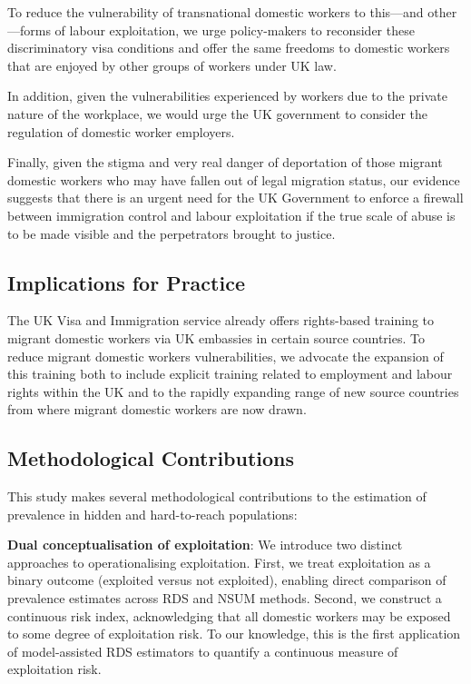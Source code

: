 \documentclass[
  12pt,
  letterpaper,
  DIV=11,
  numbers=noendperiod]{scrartcl}
\theoremstyle{plain}
\theoremstyle{definition}
\begin{document}
To reduce the vulnerability of transnational domestic workers to
this---and other---forms of labour exploitation, we urge policy-makers
to reconsider these discriminatory visa conditions and offer the same
freedoms to domestic workers that are enjoyed by other groups of workers
under UK law.

In addition, given the vulnerabilities experienced by workers due to the
private nature of the workplace, we would urge the UK government to
consider the regulation of domestic worker employers.

Finally, given the stigma and very real danger of deportation of those
migrant domestic workers who may have fallen out of legal migration
status, our evidence suggests that there is an urgent need for the UK
Government to enforce a firewall between immigration control and labour
exploitation if the true scale of abuse is to be made visible and the
perpetrators brought to justice.

\subsection{Implications for Practice}\label{implications-for-practice}

The UK Visa and Immigration service already offers rights-based training
to migrant domestic workers via UK embassies in certain source
countries. To reduce migrant domestic workers vulnerabilities, we
advocate the expansion of this training both to include explicit
training related to employment and labour rights within the UK and to
the rapidly expanding range of new source countries from where migrant
domestic workers are now drawn.

\subsection{Methodological
Contributions}\label{methodological-contributions}

This study makes several methodological contributions to the estimation
of prevalence in hidden and hard-to-reach populations:

\textbf{Dual conceptualisation of exploitation}: We introduce two
distinct approaches to operationalising exploitation. First, we treat
exploitation as a binary outcome (exploited versus not exploited),
enabling direct comparison of prevalence estimates across RDS and NSUM
methods. Second, we construct a continuous risk index, acknowledging
that all domestic workers may be exposed to some degree of exploitation
risk. To our knowledge, this is the first application of model-assisted
RDS estimators to quantify a continuous measure of exploitation risk.
\end{document}
